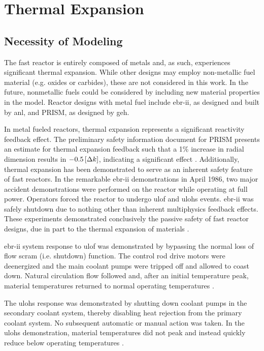 \chapter{Thermal Expansion}
\label{ch:thermalExpansion}

\section{Necessity of Modeling}
  The fast reactor is entirely composed of metals and, as such,
  experiences significant thermal expansion. While other designs may employ
  non-metallic fuel material (e.g. oxides or carbides), these are not considered
  in this work. In the future, nonmetallic fuels could be considered by
  including new material properties in the model. Reactor designs with metal
  fuel include \gls{ebr-ii}, as designed and built by \gls{anl}, and PRISM, as
  designed by \gls{geh}.

  In metal fueled reactors, thermal expansion represents a significant
  reactivity feedback effect. The preliminary safety information document for
  PRISM presents an estimate for thermal expansion feedback such that a 1\%
  increase in radial dimension results in $-0.5 \left[\text{{$\Delta k$}}\right]$, indicating a
  significant effect \cite{GEFR793}. Additionally, thermal expansion has been
  demonstrated to serve as an inherent safety feature of fast reactors. In the
  remarkable \gls{ebr-ii} demonstrations in April 1986, two major accident
  demonstrations were performed on the reactor while operating at full power.
  Operators forced the reactor to undergo \gls{ulof} and \gls{ulohs} events.
  \gls{ebr-ii} was safely shutdown due to nothing other than inherent
  multiphysics feedback effects. These experiments demonstrated conclusively the
  passive safety of fast reactor designs, due in part to the thermal expansion
  of materials \cite{PlentifulEnergy}.

  \gls{ebr-ii} system response to \gls{ulof} was demonstrated by bypassing the
  normal loss of flow scram (i.e. shutdown) function. The control rod drive
  motors were deenergized and the main coolant pumps were tripped off and
  allowed to coast down. Natural circulation flow followed and, after an initial
  temperature peak, material temperatures returned to normal operating
  temperatures \cite{ebriitests}. 
  
  The \gls{ulohs} response was demonstrated by
  shutting down coolant pumps in the secondary coolant system, thereby disabling
  heat rejection from the primary coolant system. No subsequent automatic or
  manual action was taken. In the \gls{ulohs} demonstration, material
  temperatures did not peak and instead quickly reduce below operating
  temperatures \cite{ebriitests}.

